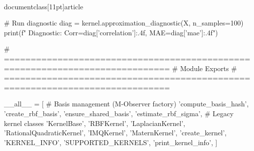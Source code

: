 \\documentclass[11pt]{article}
\begin{document}
\begin{CodeBlock}
        # Run diagnostic
        diag = kernel.approximation_diagnostic(X, n_samples=100)
        print(f"  Diagnostic: Corr={diag['correlation']:.4f}, MAE={diag['mae']:.4f}")


# =============================================================================
# Module Exports
# =============================================================================

__all__ = [
    # Basis management (M-Observer factory)
    'compute_basis_hash',
    'create_rbf_basis',
    'ensure_shared_basis',
    'estimate_rbf_sigma',
    # Legacy kernel classes
    'KernelBase',
    'RBFKernel',
    'LaplacianKernel',
    'RationalQuadraticKernel',
    'IMQKernel',
    'MaternKernel',
    'create_kernel',
    'KERNEL_INFO',
    'SUPPORTED_KERNELS',
    'print_kernel_info',
]
\end{CodeBlock}
\end{document}
